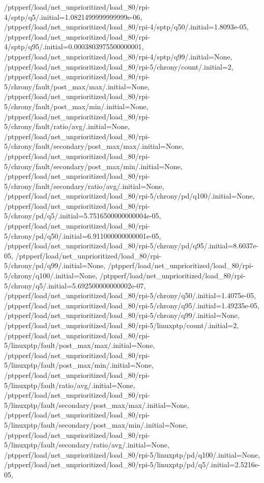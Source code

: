 {    /ptpperf/load/net_unprioritized/load_80/rpi-4/sptp/q5/.initial=1.0821499999999999e-06,
    /ptpperf/load/net_unprioritized/load_80/rpi-4/sptp/q50/.initial=1.8093e-05,
    /ptpperf/load/net_unprioritized/load_80/rpi-4/sptp/q95/.initial=0.0003803975500000001,
    /ptpperf/load/net_unprioritized/load_80/rpi-4/sptp/q99/.initial=None,
    /ptpperf/load/net_unprioritized/load_80/rpi-5/chrony/count/.initial=2,
    /ptpperf/load/net_unprioritized/load_80/rpi-5/chrony/fault/post_max/max/.initial=None,
    /ptpperf/load/net_unprioritized/load_80/rpi-5/chrony/fault/post_max/min/.initial=None,
    /ptpperf/load/net_unprioritized/load_80/rpi-5/chrony/fault/ratio/avg/.initial=None,
    /ptpperf/load/net_unprioritized/load_80/rpi-5/chrony/fault/secondary/post_max/max/.initial=None,
    /ptpperf/load/net_unprioritized/load_80/rpi-5/chrony/fault/secondary/post_max/min/.initial=None,
    /ptpperf/load/net_unprioritized/load_80/rpi-5/chrony/fault/secondary/ratio/avg/.initial=None,
    /ptpperf/load/net_unprioritized/load_80/rpi-5/chrony/pd/q100/.initial=None,
    /ptpperf/load/net_unprioritized/load_80/rpi-5/chrony/pd/q5/.initial=5.7516500000000004e-05,
    /ptpperf/load/net_unprioritized/load_80/rpi-5/chrony/pd/q50/.initial=6.911000000000001e-05,
    /ptpperf/load/net_unprioritized/load_80/rpi-5/chrony/pd/q95/.initial=8.6037e-05,
    /ptpperf/load/net_unprioritized/load_80/rpi-5/chrony/pd/q99/.initial=None,
    /ptpperf/load/net_unprioritized/load_80/rpi-5/chrony/q100/.initial=None,
    /ptpperf/load/net_unprioritized/load_80/rpi-5/chrony/q5/.initial=5.692500000000002e-07,
    /ptpperf/load/net_unprioritized/load_80/rpi-5/chrony/q50/.initial=1.4075e-05,
    /ptpperf/load/net_unprioritized/load_80/rpi-5/chrony/q95/.initial=1.49235e-05,
    /ptpperf/load/net_unprioritized/load_80/rpi-5/chrony/q99/.initial=None,
    /ptpperf/load/net_unprioritized/load_80/rpi-5/linuxptp/count/.initial=2,
    /ptpperf/load/net_unprioritized/load_80/rpi-5/linuxptp/fault/post_max/max/.initial=None,
    /ptpperf/load/net_unprioritized/load_80/rpi-5/linuxptp/fault/post_max/min/.initial=None,
    /ptpperf/load/net_unprioritized/load_80/rpi-5/linuxptp/fault/ratio/avg/.initial=None,
    /ptpperf/load/net_unprioritized/load_80/rpi-5/linuxptp/fault/secondary/post_max/max/.initial=None,
    /ptpperf/load/net_unprioritized/load_80/rpi-5/linuxptp/fault/secondary/post_max/min/.initial=None,
    /ptpperf/load/net_unprioritized/load_80/rpi-5/linuxptp/fault/secondary/ratio/avg/.initial=None,
    /ptpperf/load/net_unprioritized/load_80/rpi-5/linuxptp/pd/q100/.initial=None,
    /ptpperf/load/net_unprioritized/load_80/rpi-5/linuxptp/pd/q5/.initial=2.5216e-05,
}
